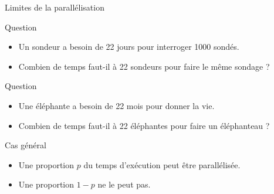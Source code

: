 
\begingroup

\begin{frame}{Limites de la parallélisation}

  \begin{alertblock}{Question}
    \begin{itemize}
    \item Un sondeur a besoin de 22 jours pour interroger 1000 sondés.
    \item Combien de temps faut-il à 22 sondeurs pour faire le même sondage ?
    \end{itemize}
  \end{alertblock}

  \pause

  \begin{alertblock}{Question}
    \begin{itemize}
    \item Une éléphante a besoin de 22 mois pour donner la vie.
    \item Combien de temps faut-il à 22 éléphantes pour faire un éléphanteau ?
    \end{itemize}
  \end{alertblock}

  \pause

  \begin{block}{Cas général}
    \begin{itemize}
    \item Une proportion $p$ du temps d'exécution peut être parallélisée.
    \item Une proportion $1-p$ ne le peut pas.
    \end{itemize}
  \end{block}

\end{frame}

\endgroup
\endinput
